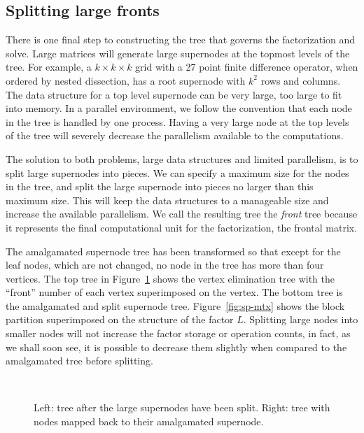 \subsection{Splitting large fronts}
\label{subsection:sp-tree}
\par
There is one final step to constructing the tree that governs the
factorization and solve.
Large matrices will generate large supernodes at the topmost levels
of the tree.
For example, a $k \times k \times k$ grid with a 27 point finite
difference operator, when ordered by nested dissection, has a root
supernode with $k^2$ rows and columns.
The data structure for a top level supernode can be very large,
too large to fit into memory.
In a parallel environment, we follow the convention that each node
in the tree is handled by one process.
Having a very large node at the top levels of the tree will
severely decrease the parallelism available to the computations.
\par
The solution to both problems, large data structures and limited
parallelism, is to split large supernodes into pieces.
We can specify a maximum size for the nodes in the tree, and split
the large supernode into pieces no larger than this maximum size.
This will keep the data structures to a manageable size and increase
the available parallelism.  We call the resulting tree the {\it front}
tree because it represents the final computational unit for the
factorization, the frontal matrix.
\par
The amalgamated supernode tree has been transformed so that except for
the leaf nodes, which are not changed, no node in the tree has more 
than four vertices.
The top tree in Figure~\ref{fig:sp-trees}
shows the vertex elimination tree with the ``front'' number of each
vertex superimposed on the vertex.
The bottom tree is the amalgamated and split supernode tree.
Figure~\ref{fig:sp-mtx} shows the block partition superimposed on
the structure of the factor $L$.
Splitting large nodes into smaller nodes will not increase the
factor storage or operation counts, in fact, as we shall soon see,
it is possible to decrease them slightly when compared to the
amalgamated tree before splitting.
\par
\begin{figure}[htbp]
\caption{Left: tree after the large supernodes have been split.
Right: tree with nodes mapped back to their amalgamated supernode.}
\label{fig:sp-trees}
\begin{center}
\mbox{
}
\quad
\mbox{
}
\end{center}
\end{figure}
